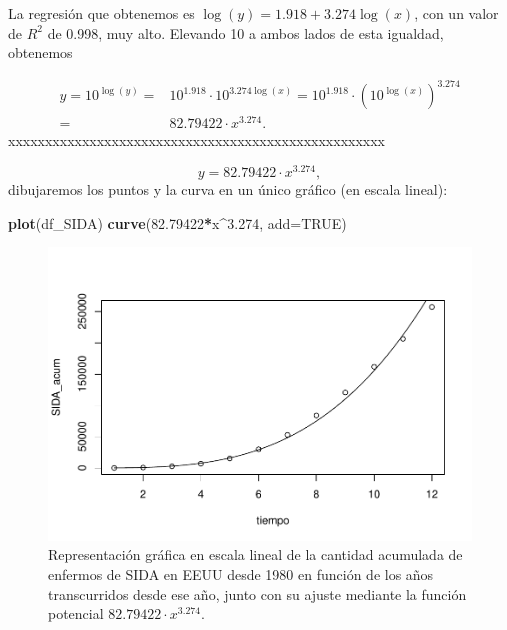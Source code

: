 \documentclass[
]{book}
\newenvironment{Shaded}{\begin{snugshade}}{\end{snugshade}}
\newcommand{\DataTypeTok}[1]{\textcolor[rgb]{0.13,0.29,0.53}{#1}}
\newcommand{\FloatTok}[1]{\textcolor[rgb]{0.00,0.00,0.81}{#1}}
\newcommand{\KeywordTok}[1]{\textcolor[rgb]{0.13,0.29,0.53}{\textbf{#1}}}
\newcommand{\NormalTok}[1]{#1}
\newcommand{\OperatorTok}[1]{\textcolor[rgb]{0.81,0.36,0.00}{\textbf{#1}}}
\newcommand{\OtherTok}[1]{\textcolor[rgb]{0.56,0.35,0.01}{#1}}
\theoremstyle{definition}
\theoremstyle{definition}
\theoremstyle{definition}
\theoremstyle{remark}
\begin{document}
La regresión que obtenemos es \(\log(y)=1.918 + 3.274\log(x)\), con un valor de \(R^2\) de 0.998, muy alto.
Elevando 10 a ambos lados de esta igualdad, obtenemos

\begin{align*}
y=10^{\log(y)}= & 10^{1.918}\cdot 10^{3.274\log(x)}=10^{1.918}\cdot (10^{\log(x)})^{3.274}
\\ = & 82.79422\cdot x^{3.274}.
\end{align*}
xxxxxxxxxxxxxxxxxxxxxxxxxxxxxxxxxxxxxxxxxxxxxxxxxxx

\[
y=82.79422\cdot x^{3.274},
\]
dibujaremos los puntos y la curva en un único gráfico (en escala lineal):

\begin{Shaded}
\begin{Highlighting}[]
\KeywordTok{plot}\NormalTok{(df\_SIDA)}
\KeywordTok{curve}\NormalTok{(}\FloatTok{82.79422}\OperatorTok{*}\NormalTok{x}\OperatorTok{\^{}}\FloatTok{3.274}\NormalTok{, }\DataTypeTok{add=}\OtherTok{TRUE}\NormalTok{)}
\end{Highlighting}
\end{Shaded}

\begin{figure}

{\centering \includegraphics[width=0.9\linewidth]{03chap02_Un_aperitivo_files/figure-latex/SF3010-1} 

}

\caption{Representación gráfica en escala lineal de la cantidad acumulada de enfermos de SIDA en EEUU desde 1980 en función de los años transcurridos desde ese año, junto con su ajuste mediante la función potencial 
$82.79422 · x^{3.274}$.}\label{fig:SF3010}
\end{figure}
\end{document}
